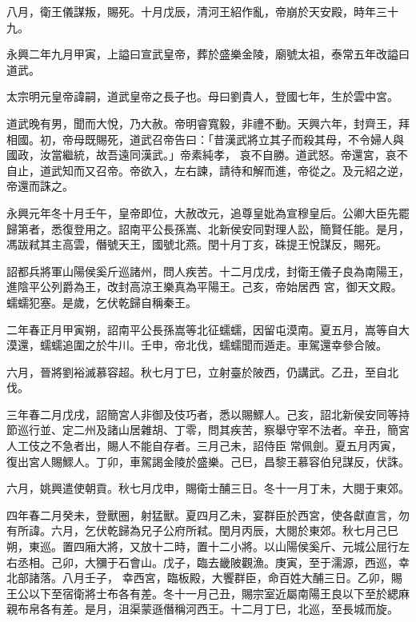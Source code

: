 \begin{pinyinscope}
 八月，衛王儀謀叛，賜死。十月戊辰，清河王紹作亂，帝崩於天安殿，時年三十九。



 永興二年九月甲寅，上謚曰宣武皇帝，葬於盛樂金陵，廟號太祖，泰常五年改謚曰道武。



 太宗明元皇帝諱嗣，道武皇帝之長子也。母曰劉貴人，登國七年，生於雲中宮。



 道武晚有男，聞而大悅，乃大赦。帝明睿寬毅，非禮不動。天興六年，封齊王，拜相國。初，帝母既賜死，道武召帝告曰：「昔漢武將立其子而殺其母，不令婦人與國政，汝當繼統，故吾遠同漢武。」帝素純孝，
 哀不自勝。道武怒。帝還宮，哀不自止，道武知而又召帝。帝欲入，左右諫，請待和解而進，帝從之。及元紹之逆，帝還而誅之。



 永興元年冬十月壬午，皇帝即位，大赦改元，追尊皇妣為宣穆皇后。公卿大臣先罷歸第者，悉復登用之。詔南平公長孫嵩、北新侯安同對理人訟，簡賢任能。是月，馮跋弒其主高雲，僭號天王，國號北燕。閏十月丁亥，硃提王悅謀反，賜死。



 詔都兵將軍山陽侯奚斤巡諸州，問人疾苦。十二月戊戌，封衛王儀子良為南陽王，進陰平公列爵為王，改封高涼王樂真為平陽王。己亥，帝始居西
 宮，御天文殿。蠕蠕犯塞。是歲，乞伏乾歸自稱秦王。



 二年春正月甲寅朔，詔南平公長孫嵩等北征蠕蠕，因留屯漠南。夏五月，嵩等自大漠還，蠕蠕追圍之於牛川。壬申，帝北伐，蠕蠕聞而遁走。車駕還幸參合陂。



 六月，晉將劉裕滅慕容超。秋七月丁巳，立射臺於陂西，仍講武。乙丑，至自北伐。



 三年春二月戊戌，詔簡宮人非御及伎巧者，悉以賜鰥人。己亥，詔北新侯安同等持節巡行並、定二州及諸山居雜胡、丁零，問其疾苦，察舉守宰不法者。辛丑，簡宮人工伎之不急者出，賜人不能自存者。三月己未，詔侍臣
 常佩劍。夏五月丙寅，復出宮人賜鰥人。丁卯，車駕謁金陵於盛樂。己巳，昌黎王慕容伯兒謀反，伏誅。



 六月，姚興遣使朝貢。秋七月戊申，賜衛士酺三日。冬十一月丁未，大閱于東郊。



 四年春二月癸未，登獸圈，射猛獸。夏四月乙未，宴群臣於西宮，使各獻直言，勿有所諱。六月，乞伏乾歸為兄子公府所弒。閏月丙辰，大閱於東郊。秋七月己巳朔，東巡。置四廂大將，又放十二時，置十二小將。以山陽侯奚斤、元城公屈行左右丞相。己卯，大獼于石會山。戊子，臨去畿陂觀漁。庚寅，至于濡源，西巡，幸北部諸落。八月壬子，
 幸西宮，臨板殿，大饗群臣，命百姓大酺三日。乙卯，賜王公以下至宿衛將士布各有差。冬十一月己丑，賜宗室近屬南陽王良以下至於緦麻親布帛各有差。是月，沮渠蒙遜僭稱河西王。十二月丁巳，北巡，至長城而旋。




\end{pinyinscope}
